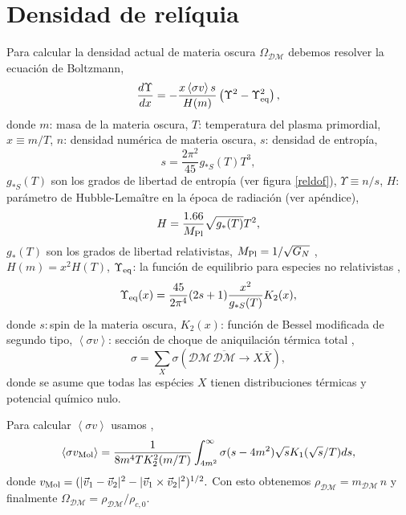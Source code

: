 \newpage

\section[\hspace{-0.14in}Densidad de relíquia]{Densidad de relíquia}
Para calcular la densidad actual de materia oscura $\Omega_{\mathcal{DM}}$ debemos resolver la ecuación de Boltzmann,
\begin{equation}
\frac{d\Upsilon}{dx} = -\frac{x\left< \sigma v \right>s}{H(m)} \left( \Upsilon^2 - \Upsilon^2_{\rm eq} \right),
\end{equation}
donde $m$: masa de la materia oscura, $T$: temperatura del plasma primordial, $x\equiv m/T$, $n$: densidad numérica de materia oscura, $s$: densidad de entropía, 
\begin{equation}
s = \frac{2\pi^2}{45} g_{*S}(T) T^3,
\end{equation}
$g_{*S}(T)$ son los grados de libertad de entropía (ver figura \ref{reldof}), $\Upsilon \equiv n/s$, $H$: parámetro de Hubble-Lema\^itre en la época de radiación (ver apéndice),
\begin{equation}
H = \frac{1.66}{M_{\rm Pl}} \sqrt{g_*(T)}T^2,
\end{equation}
$g_*(T)$ son los grados de libertad relativistas, $M_{\rm Pl}=1/\sqrt{G_N}$ , $H(m)=x^2 H(T)$, $\Upsilon_{\rm eq}$: la función de equilibrio para especies no relativistas \cite{gondolo1991cosmic}, 
\begin{equation}
\Upsilon_{\rm eq}(x) = \frac{45}{2\pi^4} (2s+1) \frac{x^2}{g_{*S}(T)}K_{2}(x),
\end{equation}
donde $s:$spin de la materia oscura, $K_{2}(x)$: función de Bessel modificada de segundo tipo, $\left< \sigma v \right>$: sección de choque de aniquilación térmica total \cite{Kolb:1990vq},
\begin{equation}
\sigma = \sum_X \sigma(\mathcal{DM} \, \overline{\mathcal{DM}} \to X \bar{X}),
\end{equation}
donde se asume que todas las espécies $X$ tienen distribuciones térmicas y potencial químico nulo. 

Para calcular $\left< \sigma v \right>$ usamos \cite{gondolo1991cosmic},
\begin{equation}
\left< \sigma v_{\rm Mol} \right> = \frac{1}{8m^4TK_2^2(m/T)} \int_{4m^2}^\infty \sigma (s-4m^2)\sqrt{s}K_1(\sqrt{s}/T)ds,
\label{svMol}
\end{equation}
donde $v_{\rm Mol}=(|\vec{v}_1-\vec{v}_2|^2-|\vec{v}_1 \times \vec{v}_2|^2)^{1/2}.$ Con esto obtenemos $\rho_{\mathcal{DM}} = m_\mathcal{DM} \, n$ y finalmente $\Omega_{\mathcal{DM}}= \rho_\mathcal{DM}/\rho_{c,0}$.

